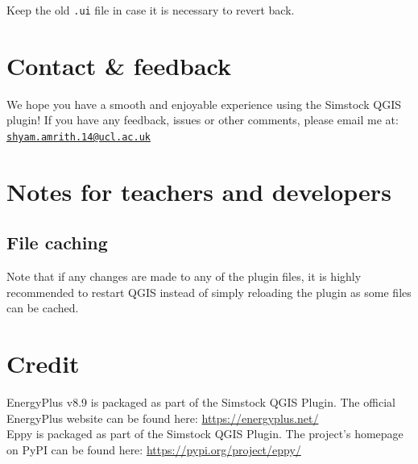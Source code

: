 \documentclass{article}
\begin{document}
Keep the old \texttt{.ui} file in case it is necessary to revert back.

\section{Contact \& feedback}
We hope you have a smooth and enjoyable experience using the Simstock QGIS plugin! If you have any feedback, issues or other comments, please email me at: \href{mailto:shyam.amrith.14@ucl.ac.uk}{\texttt{shyam.amrith.14@ucl.ac.uk}}

\clearpage
\appendix
\section{Notes for teachers and developers}
\subsection{File caching}
Note that if any changes are made to any of the plugin files, it is highly recommended to restart QGIS instead of simply reloading the plugin as some files can be cached.



\section{Credit}
EnergyPlus v8.9 is packaged as part of the Simstock QGIS Plugin. The official EnergyPlus website can be found here: \url{https://energyplus.net/} \\

Eppy is packaged as part of the Simstock QGIS Plugin. The project's homepage on PyPI can be found here: \url{https://pypi.org/project/eppy/}

\end{document}
